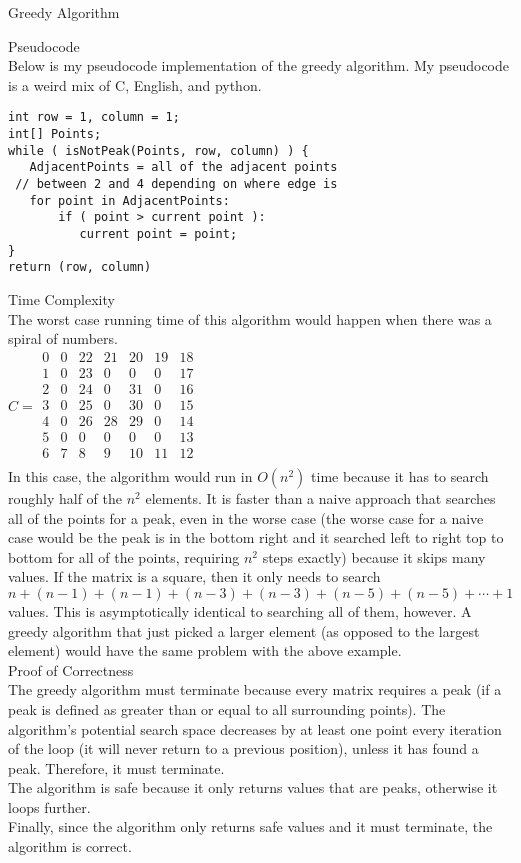 \documentclass[12pt,twoside]{article}
\begin{document}
\begin{problems}
\begin{problemparts}
\end{problemparts}
\problem Greedy Algorithm
\begin{problemparts}
\problempart Pseudocode\\
Below is my pseudocode implementation of the greedy algorithm.  My pseudocode is a weird mix of C, English, and python.
\lstset{language=Java, caption=Psuedocode}
\begin{lstlisting}
int row = 1, column = 1;
int[] Points;
while ( isNotPeak(Points, row, column) ) {
   AdjacentPoints = all of the adjacent points
 // between 2 and 4 depending on where edge is
   for point in AdjacentPoints:
       if ( point > current point ):
          current point = point;
}
return (row, column)
\end{lstlisting}
\problempart Time Complexity\\
The worst case running time of this algorithm would happen when there was a spiral of numbers.\\
$C = \begin{array}{ccccccc}
0 &0 &22 &21 &20 &19 &18 \\
1 &0 &23 &0 &0  &0  &17 \\
2 &0 &24 &0 &31  &0  &16\\
3 &0 &25 &0 &30 &0  &15\\
4 &0 &26 &28 &29 &0  &14\\
5 &0 &0  &0 &0   &0  &13\\
6 &7 &8  &9 &10  &11 &12\\
\end{array}$
\\
In this case, the algorithm would run in $O(n^2)$ time because it has to search roughly half of the $n^2$ elements.  It is faster than a naive approach that searches all of the points for a peak, even in the worse case (the worse case for a naive case would be the peak is in the bottom right and it searched left to right top to bottom for all of the points, requiring $n^2$ steps exactly) because it skips many values.  If the matrix is a square, then it only needs to search $n + (n - 1) + (n - 1) + (n - 3) + (n - 3) + (n - 5) + (n - 5) + \cdots + 1$ values.  This is asymptotically identical to searching all of them, however.  A greedy algorithm that just picked a larger element (as opposed to the largest element) would have the same problem with the above example.\\
\problempart Proof of Correctness\\
The greedy algorithm must terminate because every matrix requires a peak (if a peak is defined as greater than or equal to all surrounding points). The algorithm's potential search space decreases by at least one point every iteration of the loop (it will never return to a previous position), unless it has found a peak.  Therefore, it must terminate.\\
The algorithm is safe because it only returns values that are peaks, otherwise it loops further.\\
Finally, since the algorithm only returns safe values and it must terminate, the algorithm is correct. 
\end{problemparts}

\end{problems}
\end{document}
